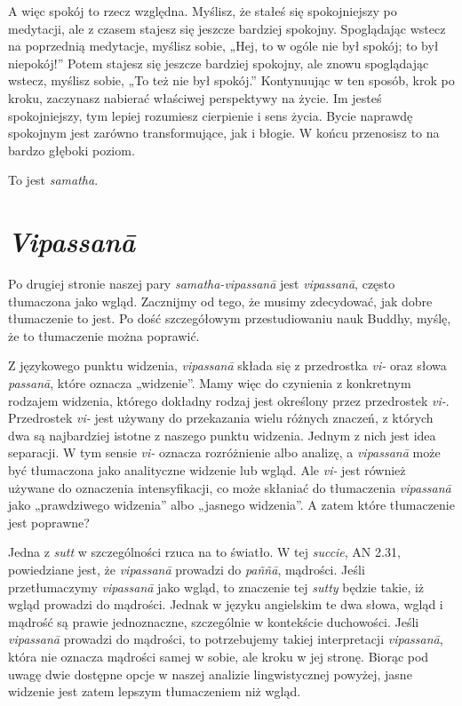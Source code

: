 \documentclass[12pt,openany]{book}
\begin{document}
A więc spokój to rzecz względna. Myślisz, że stałeś się spokojniejszy po medytacji, ale z czasem stajesz się jeszcze bardziej spokojny. Spoglądając wstecz na poprzednią medytacje, myślisz sobie, „Hej, to w ogóle nie był spokój; to był niepokój!” Potem stajesz się jeszcze bardziej spokojny, ale znowu spoglądając wstecz, myślisz sobie, „To też nie był spokój.” Kontynuując w ten sposób, krok po kroku, zaczynasz nabierać właściwej perspektywy na życie. Im jesteś spokojniejszy, tym lepiej rozumiesz cierpienie i sens życia. Bycie naprawdę spokojnym jest zarówno transformujące, jak i błogie. W końcu przenosisz to na bardzo głęboki poziom.

To jest \textit{samatha}.

\section*{\textit{Vipassanā}}

Po drugiej stronie naszej pary \textit{samatha}\textit{-vipassanā} jest \textit{vipassanā}, często tłumaczona jako wgląd. Zacznijmy od tego, że musimy zdecydować, jak dobre tłumaczenie to jest. Po dość szczegółowym przestudiowaniu nauk Buddhy, myślę, że to tłumaczenie można poprawić.

Z językowego punktu widzenia, \textit{vipassanā} składa się z przedrostka \textit{vi-} oraz słowa \textit{passanā}, które oznacza „widzenie”. Mamy więc do czynienia z konkretnym rodzajem widzenia, którego dokładny rodzaj jest określony przez przedrostek \textit{vi-}. Przedrostek \textit{vi-} jest używany do przekazania wielu różnych znaczeń, z których dwa są najbardziej istotne z naszego punktu widzenia. Jednym z nich jest idea separacji. W tym sensie \textit{vi-} oznacza rozróżnienie albo analizę, a \textit{vipassanā} może być tłumaczona jako analityczne widzenie lub wgląd. Ale \textit{vi-} jest również używane do oznaczenia intensyfikacji, co może skłaniać do tłumaczenia \textit{vipassanā} jako „prawdziwego widzenia” albo „jasnego widzenia”. A zatem które tłumaczenie jest poprawne?

Jedna z \textit{sutt} w szczególności rzuca na to światło. W tej \textit{succie}, AN 2.31, powiedziane jest, że \textit{vipassanā} prowadzi do \textit{paññā}, mądrości. Jeśli przetłumaczymy \textit{vipassanā} jako wgląd, to znaczenie tej \textit{sutty} będzie takie, iż wgląd prowadzi do mądrości. Jednak w języku angielskim te dwa słowa, wgląd i mądrość są prawie jednoznaczne, szczególnie w kontekście duchowości. Jeśli \textit{vipassanā} prowadzi do mądrości, to potrzebujemy takiej interpretacji \textit{vipassanā}, która nie oznacza mądrości samej w sobie, ale kroku w jej stronę. Biorąc pod uwagę dwie dostępne opcje w naszej analizie lingwistycznej powyżej, jasne widzenie jest zatem lepszym tłumaczeniem niż wgląd.
\end{document}
